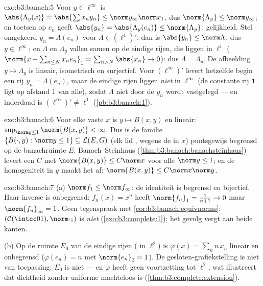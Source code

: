\begin{solution}{exo:b3:banach:5}
Voor $y \in \ell^\infty$ is $\abs{\Lambda_y(x)} = \abs{\sum
x_ny_n} \leq \norm y_\infty\norm x_1$, dus $\norm{\Lambda_y} \leq
\norm y_\infty$; en toetsen op $e_n$ geeft $\abs{y_n} =
\abs{\Lambda_y(e_n)} \leq \norm{\Lambda_y}$: gelijkheid. Stel
omgekeerd $y_n = \Lambda(e_n)$ voor $\Lambda \in (\ell^1)'$: dan
is $\abs{y_n} \leq \norm\Lambda$, dus $y \in \ell^\infty$; en
$\Lambda$ en $\Lambda_y$ vallen samen op de eindige rijen, die
 liggen in $\ell^1$ ($\norm{x - \sum_{n\leq N}x_ne_n}_1 =
\sum_{n>N}\abs{x_n} \to 0$): dus $\Lambda = \Lambda_y$. De
afbeelding $y \mapsto \Lambda_y$ is lineair, isometrisch en
surjectief. Voor $(\ell^\infty)'$ levert hetzelfde begin een rij
$y_n = \Lambda(e_n)$, maar de eindige rijen liggen \emph{niet}
 in $\ell^\infty$ (de constante rij $\mathbf 1$ ligt op
afstand $1$ van alle), zodat $\Lambda$ niet door de $y_n$ wordt
vastgelegd --- en inderdaad is $(\ell^\infty)' \neq \ell^1$
(\cref{pb:b3:banach:1}).
\end{solution}

\begin{solution}{exo:b3:banach:6}
Voor elke vaste $x$ is $y \mapsto B(x, y)$  en lineair:
$\sup_{\norm y \leq 1}\norm{B(x,y)} < \infty$. Dus is de familie
$\{B(\cdot, y) : \norm y \leq 1\} \subseteq \mathcal L(E, G)$
(elk lid , wegens de  in $x$) puntsgewijs
begrensd op de banachruimte $E$: Banach--Steinhaus
(\cref{thm:b3:banach:banachsteinhaus}) levert een $C$ met
$\norm{B(x,y)} \leq C\norm x$ voor alle $\norm y \leq 1$; en de
homogeniteit in $y$ maakt het af: $\norm{B(x,y)} \leq C\norm
x\norm y$.
\end{solution}

\begin{solution}{exo:b3:banach:7}
(a) $\norm f_1 \leq \norm f_\infty$: de identiteit is begrensd en
bijectief. Haar inverse is onbegrensd: $f_n(x) = x^n$ heeft
$\norm{f_n}_1 = \frac1{n+1} \to 0$ maar $\norm{f_n}_\infty = 1$.
Geen tegenspraak met \cref{cor:b3:banach:equivnorms}: $(\mathcal
C(\intcc01), \norm\cdot_1)$ is \emph{niet} 
(\cref{exo:b3:complete:1}); het gevolg vergt  aan
beide kanten.

(b) Op de ruimte $E_0$ van de eindige rijen ( in $\ell^2$)
is $\varphi(x) = \sum_n n\,x_n$ lineair en onbegrensd
($\varphi(e_n) = n$ met $\norm{e_n}_2 = 1$). De
gesloten-grafiekstelling is niet van toepassing: $E_0$ is niet
 --- en $\varphi$ heeft geen  voortzetting tot
$\ell^2$, wat illustreert dat dichtheid zonder uniforme
 machteloos is
(\cref{thm:b3:complete:extension}).
\end{solution}


